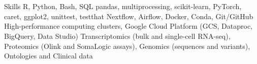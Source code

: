 \section{\faGears}{Skills}
 \resumeEntryStart
   {R, Python, Bash, SQL}
   {pandas, multiprocessing, scikit-learn, PyTorch, caret, ggplot2, unittest, testthat}
   {Nextflow, Airflow, Docker, Conda, Git/GitHub}  %
   {High-performance computing clusters, Google Cloud Platform (GCS, Dataproc, BigQuery, Data Studio)}
   {Transcriptomics (bulk and single-cell RNA-seq), Proteomics (Olink and SomaLogic assays), Genomics (sequences and variants), Ontologies and Clinical data}
 \resumeEntryEnd

\vspace{5pt}
